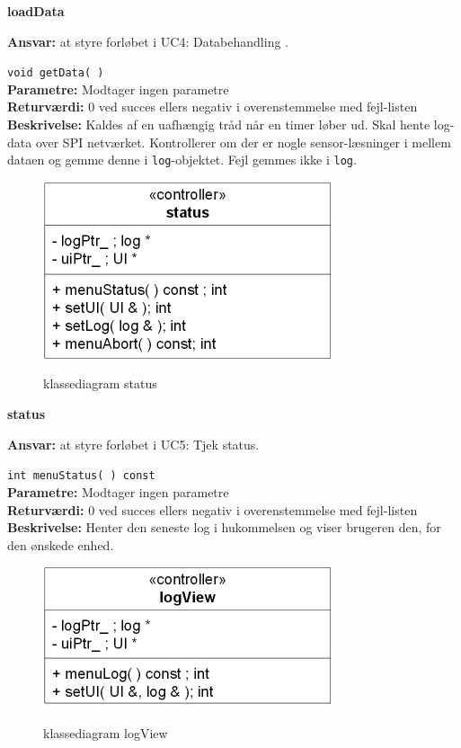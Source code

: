 {\centering
\textbf{loadData}\par
}
\textbf{Ansvar:} at styre forløbet i UC4: Databehandling . \

\verb+void getData( )+ \\
\textbf{Parametre:} Modtager ingen parametre \\
\textbf{Returværdi:} 0 ved succes ellers negativ i overenstemmelse med fejl-listen \\
\textbf{Beskrivelse:} Kaldes af en uafhængig tråd når en timer løber ud. Skal hente log-data over SPI netværket. Kontrollerer om der er nogle sensor-læsninger i mellem dataen og gemme denne i \verb+log+-objektet. Fejl gemmes ikke i \verb+log+.\\

\begin{figure}[htbp] \centering
{\includegraphics[scale=1.5]{filer/design/Klassediagrammer/sw_status}}
\caption{klassediagram status}
\label{fig:status klassediagram}
\end{figure} 

\newpage

{\centering
\textbf{status}\par
}
\textbf{Ansvar:} at styre forløbet i UC5: Tjek status. \

\verb+int menuStatus( ) const+ \\
\textbf{Parametre:} Modtager ingen parametre \\
\textbf{Returværdi:} 0 ved succes ellers negativ i overenstemmelse med fejl-listen \\
\textbf{Beskrivelse:} Henter den seneste log i hukommelsen og viser brugeren den, for den ønskede enhed.\\

\begin{figure}[htbp] \centering
{\includegraphics[scale=1.5]{filer/design/Klassediagrammer/sw_logView}}
\caption{klassediagram logView}
\label{fig:logView klassediagram}
\end{figure}

